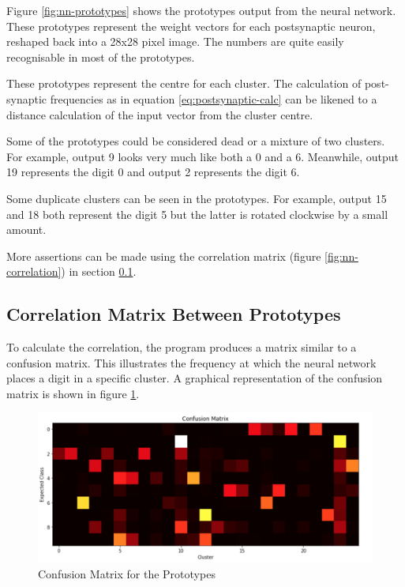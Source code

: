 \documentclass[11pt,journal,transmag,final]{IEEEtran}
\begin{document}
Figure \ref{fig:nn-prototypes} shows the prototypes output from the neural network. These prototypes represent the weight vectors for each postsynaptic neuron, reshaped back into a 28x28 pixel image. The numbers are quite easily recognisable in most of the prototypes.

These prototypes represent the centre for each cluster. The calculation of post-synaptic frequencies as in equation \ref{eq:postsynaptic-calc} can be likened to a distance calculation of the input vector from the cluster centre.

Some of the prototypes could be considered dead or a mixture of two clusters. For example, output 9 looks very much like both a 0 and a 6. Meanwhile, output 19 represents the digit 0 and output 2 represents the digit 6.

Some duplicate clusters can be seen in the prototypes. For example, output 15 and 18 both represent the digit 5 but the latter is rotated clockwise by a small amount.

More assertions can be made using the correlation matrix (figure \ref{fig:nn-correlation}) in section \ref{section:nn:correlation}.

\subsection{Correlation Matrix Between Prototypes}
\label{section:nn:correlation}

To calculate the correlation, the program produces a matrix similar to a confusion matrix. This illustrates the frequency at which the neural network places a digit in a specific cluster. A graphical representation of the confusion matrix is shown in figure \ref{fig:nn-confusion}.

\begin{figure}
    \begin{center}
        \includegraphics[width=\linewidth,keepaspectratio]{figures/nn-confusion.png}
        \caption{Confusion Matrix for the Prototypes}
        \label{fig:nn-confusion}
    \end{center}
\end{figure}
\end{document}
